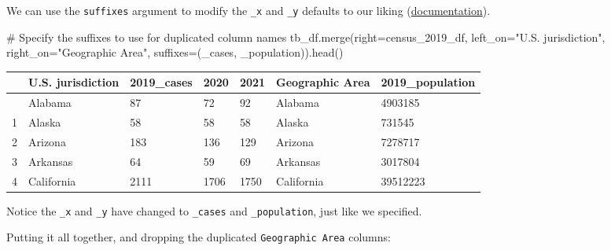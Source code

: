 \documentclass[
  letterpaper,
  DIV=11,
  numbers=noendperiod]{scrreprt}
\newenvironment{Shaded}{\begin{snugshade}}{\end{snugshade}}
\newcommand{\CommentTok}[1]{\textcolor[rgb]{0.37,0.37,0.37}{#1}}
\newcommand{\NormalTok}[1]{\textcolor[rgb]{0.00,0.23,0.31}{#1}}
\newcommand{\OperatorTok}[1]{\textcolor[rgb]{0.37,0.37,0.37}{#1}}
\newcommand{\StringTok}[1]{\textcolor[rgb]{0.13,0.47,0.30}{#1}}
\begin{document}
We can use the \texttt{suffixes} argument to modify the \texttt{\_x} and
\texttt{\_y} defaults to our liking
(\href{https://pandas.pydata.org/docs/reference/api/pandas.merge.html\#pandas.merge}{documentation}).

\begin{Shaded}
\begin{Highlighting}[]
\CommentTok{\# Specify the suffixes to use for duplicated column names}
\NormalTok{tb\_df.merge(right}\OperatorTok{=}\NormalTok{census\_2019\_df,}
\NormalTok{           left\_on}\OperatorTok{=}\StringTok{"U.S. jurisdiction"}\NormalTok{, }
\NormalTok{           right\_on}\OperatorTok{=}\StringTok{"Geographic Area"}\NormalTok{,}
\NormalTok{           suffixes}\OperatorTok{=}\NormalTok{(}\StringTok{\textquotesingle{}\_cases\textquotesingle{}}\NormalTok{, }\StringTok{\textquotesingle{}\_population\textquotesingle{}}\NormalTok{)).head()}
\end{Highlighting}
\end{Shaded}

\begin{longtable}[]{@{}lllllll@{}}
\toprule\noalign{}
& U.S. jurisdiction & 2019\_cases & 2020 & 2021 & Geographic Area &
2019\_population \\
\midrule\noalign{}
\endhead
\bottomrule\noalign{}
\endlastfoot
0 & Alabama & 87 & 72 & 92 & Alabama & 4903185 \\
1 & Alaska & 58 & 58 & 58 & Alaska & 731545 \\
2 & Arizona & 183 & 136 & 129 & Arizona & 7278717 \\
3 & Arkansas & 64 & 59 & 69 & Arkansas & 3017804 \\
4 & California & 2111 & 1706 & 1750 & California & 39512223 \\
\end{longtable}

Notice the \texttt{\_x} and \texttt{\_y} have changed to
\texttt{\_cases} and \texttt{\_population}, just like we specified.

Putting it all together, and dropping the duplicated
\texttt{Geographic\ Area} columns:
\end{document}
